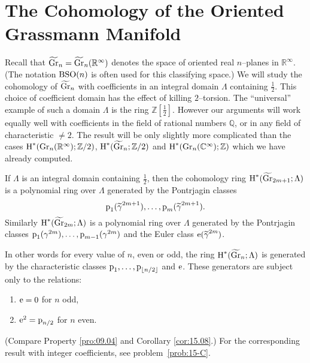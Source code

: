 \documentclass[../main]{subfiles}
\begin{document}
\section{The Cohomology of the Oriented Grassmann Manifold}
Recall that ${\xtilde \grassmannian}_n = {\xtilde \grassmannian}_n({\mathbb R}^\infty)$ denotes the space of oriented real $n$--planes in ${\mathbb R}^\infty$. (The notation $\operatorname{BSO}(n)$ is often used for this classifying space.) We will study the cohomology of ${\xtilde \grassmannian}_n$ with coefficients in an integral domain $\Lambda$ containing $\tfrac 1 2$. This choice of coefficient domain has the effect of killing $2$--torsion. The ``universal'' example of such a domain $\Lambda$ is the ring $\mathbb Z \left[\tfrac 1 2\right]$. However our arguments will work equally well with coefficients in the field of rational numbers $\mathbb Q$, or in any field of characteristic $\ne 2$. The result will be only slightly more complicated than the cases $\operatorname{H}^\ast(\operatorname{Gr}_n({\mathbb R}^\infty); {\mathbb Z}/2)$, $\homology^\ast({\xtilde \grassmannian}_n; {\mathbb Z}/2)$ and $\operatorname{H}^\ast(\operatorname{Gr}_n({\mathbb C}^\infty); \mathbb Z)$ which we have already computed. 

\begin{theorem}\label{thm:15.9}
If $\Lambda$ is an integral domain containing $\tfrac 1 2$, then the cohomology ring $\homology^\ast({\xtilde \grassmannian}_{2m + 1}; \Lambda)$ is a polynomial ring over $\Lambda$ generated by the Pontrjagin classes \[\pontrjaginclass_1({\xtilde \gamma}^{2m + 1}), \ldots, \pontrjaginclass_m({\xtilde \gamma}^{2m + 1}).\] Similarly $\homology^\ast({\xtilde \grassmannian}_{2m}; \Lambda)$ is a polynomial ring over $\Lambda$ generated by the Pontrjagin classes $\operatorname{p}_1(\gamma^{2m}), \ldots, \operatorname{p}_{m - 1}(\gamma^{2m})$ and the Euler class $\eulerclass({\xtilde \gamma}^{2m})$.
\end{theorem}

In other words for every value of $n$, even or odd, the ring $\homology^\ast({\xtilde \grassmannian}_n; \Lambda)$ is generated by the characteristic classes $\operatorname{p}_1, \ldots, \operatorname{p}_{\lfloor n/2\rfloor}$ and $\operatorname{e}$. These generators are subject only to the relations:
\begin{enumerate}
    \item[] $\operatorname{e} = 0$ for $n$ odd,
    \item[] $\operatorname{e}^2 = \operatorname{p}_{n/2}$ for $n$ even.
\end{enumerate}
(Compare Property \ref{pro:09.04} and Corollary \ref{cor:15.08}.) For the corresponding result with integer coefficients, see problem~\ref{prob:15-C}. 
\end{document}
